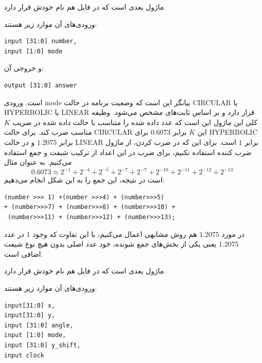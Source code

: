 \documentclass[12pt,titlepage,a4page , tikz , multi,table , svgnames,xcdraw]{article}
\begin{document}
\hrulefill

ماژول بعدی  است که در فایل هم نام خودش قرار دارد.

 
 ورودی‌های آن موارد زیر هستند:

\begin{latin}
\begin{verbatim}
input [31:0] number,
input [1:0] mode
\end{verbatim}
\end{latin}

و خروجی آن:

\begin{latin}
\begin{verbatim}
output [31:0] answer
\end{verbatim}
\end{latin}

است. ورودی mode بیانگر این است که وضعیت برنامه در حالت CIRCULAR یا HYPERBOLIC یا LINEAR قرار دارد و بر اساس ثابت‌های  مشخص می‌شود. وظیفه کلی این ماژول این است که عدد داده شده را متناسب با حالت داده شده در ضریب $K$ مناسب ضرب کند. برای حالت CIRCULAR این $K$ برابر $0.6073$ برای HYPERBOLIC برابر $1.2075$ و در حالت LINEAR برابر $1$ است. برای این که در ضرب کردن، از ماژول ضرب کننده استفاده نکنیم، برای ضرب در این اعداد از ترکیب شیفت و جمع استفاده می‌کنیم. به عنوان مثال
$$0.6073 \approx 2^{-1} + 2^{-4} + 2^{-5} + 2^{-7} + 2^{-7} + 2^{-10} + 2^{-11} + 2^{-12} + 2^{-13}$$
است در نتیجه، این جمع را به این شکل انجام می‌دهیم:

\begin{latin}
\begin{verbatim}
(number >>> 1) +(number >>>4) + (number>>>5)
+ (number>>>7) + (number>>>8) + (number>>>10) +
 (number>>>11) + (number>>>12) + (number>>>13);
\end{verbatim}
\end{latin}

در مورد $1.2075$ هم روش مشابهی اعمال می‌کنیم، با این تفاوت که وجود $1$ در عدد $1.2075$ یعنی یکی از بخش‌های جمع شونده، خود عدد اصلی بدون هیچ نوع شیفت اضافی است.

\hrulefill

ماژول بعدی  است که در فایل هم نام خودش قرار دارد.

 
 ورودی‌های آن موارد زیر هستند:

\begin{latin}
\begin{verbatim}
input[31:0] x,
input[31:0] y,
input [31:0] angle,
input [1:0] mode,
input [31:0] y_shift,
input clock
\end{verbatim}
\end{latin}
\end{document}
